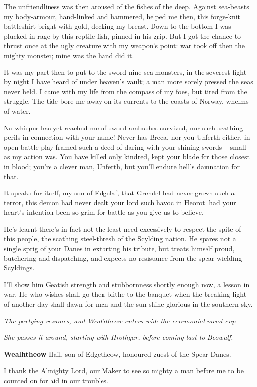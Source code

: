 \documentclass[a4paper]{article}
\begin{document}
{The unfriendliness was then aroused of the fishes of the deep.
Against sea-beasts my body-armour,
hand-linked and hammered, helped me then,
this forge-knit battleshirt bright with gold,
decking my breast. Down to the bottom
I was plucked in rage by this reptile-fish,
pinned in his grip. But I got the chance
to thrust once at the ugly creature
with my weapon’s point: war took off then
the mighty monster; mine was the hand did it.

It was my part then to put to the sword
nine sea-monsters, in the severest fight
by night I have heard of under heaven’s vault;
a man more sorely pressed the seas never held.
I came with my life from the compass of my foes,
but tired from the struggle. The tide bore me
away on its currents to the coasts of Norway,
whelms of water.

No whisper has yet reached me
of sword-ambushes survived, nor such scathing perils
in connection with your name! Never has Breca,
nor you Unferth either, in open battle-play
framed such a deed of daring with your
shining swords – small as my action was.
You have killed only kindred, kept your blade
for those closest in blood; you’re a clever man, Unferth,
but you’ll endure hell’s damnation for that.

It speaks for itself, my son of Edgelaf,
that Grendel had never grown such a terror,
this demon had never dealt your lord
such havoc in Heorot, had your heart’s intention
been so grim for battle as you give us to believe.

He’s learnt there’s in fact not the least need
excessively to respect the spite of this people,
the scathing steel-thresh of the Scylding nation.
He spares not a single sprig of your Danes
in extorting his tribute, but treats himself proud,
butchering and dispatching, and expects no resistance
from the spear-wielding Scyldings.

I’ll show him Geatish
strength and stubbornness shortly enough now,
a lesson in war. He who wishes shall go then
blithe to the banquet when the breaking light
of another day shall dawn for men
and the sun shine glorious in the southern sky.

\centerline{\textit{The partying resumes, and Wealhtheow enters with the ceremonial mead-cup.}}
\centerline{\textit{She passes it around, starting with Hrothgar, before coming last to Beowulf.}}

\textbf{Wealhtheow} Hail, son of Edgetheow,
honoured guest of the Spear-Danes.

I thank the Almighty Lord, our Maker
to see so mighty a man before me
to be counted on for aid in our troubles.

}
\end{document}
